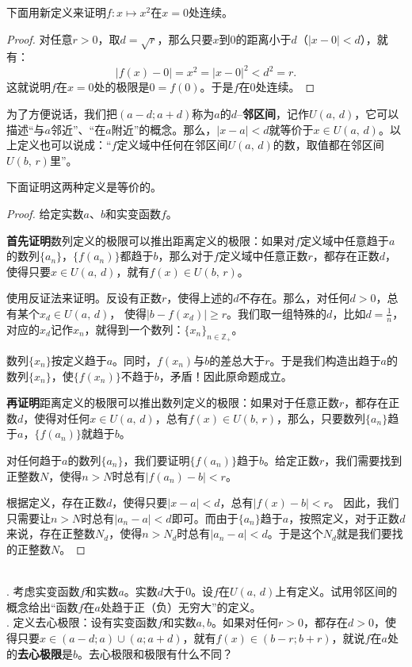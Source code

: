 \documentclass[12pt,UTF8]{ctexbook}
\begin{document}
下面用新定义来证明$f:x\mapsto x^2$在$x=0$处连续。
\begin{proof}
    对任意$r>0$，取$d = \sqrt{r}$，那么只要$x$到$0$的距离小于$d$（$|x - 0| < d$），就有：
    $$|f(x) - 0| = x^2  = |x - 0|^2 < d^2 = r.$$
    这就说明$f$在$x=0$处的极限是$0 = f(0)$。于是$f$在$0$处连续。
\end{proof}

为了方便说话，我们把$(a-d;a+d)$称为$a$的$d$–\textbf{邻区间}，记作$U(a,\,d)$，它可以描述“与$a$邻近”、“在$a$附近”的概念。那么，$|x - a| < d$就等价于$x\in U(a,\,d)$。以上定义也可以说成：“$f$定义域中任何在邻区间$U(a,\,d)$的数，取值都在邻区间$U(b,\,r)$里”。

下面证明这两种定义是等价的。
\begin{proof}
    给定实数$a$、$b$和实变函数$f$。

    \textbf{首先证明}数列定义的极限可以推出距离定义的极限：如果对$f$定义域中任意趋于$a$的数列$\{a_n\}$，$\{f(a_n)\}$都趋于$b$，那么对于$f$定义域中任意正数$r$，都存在正数$d$，使得只要$x\in U(a,\,d)$，就有$f(x)\in U(b,\,r)$。

    使用反证法来证明。反设有正数$r$，使得上述的$d$不存在。那么，对任何$d>0$，总有某个$x_d\in U(a,\,d)$，
    使得$ |b - f(x_d)| \geqslant r$。我们取一组特殊的$d$，比如$d = \frac{1}{n}$，对应的$x_d$记作$x_n$，就得到一个数列：$\{x_n\}_{n\in\mathbb{Z}_+}$。
    
    数列$\{x_n\}$按定义趋于$a$。同时，$f(x_n)$与$b$的差总大于$r$。于是我们构造出趋于$a$的数列$\{x_n\}$，使$\{f(x_n)\}$不趋于$b$，矛盾！因此原命题成立。

    \textbf{再证明}距离定义的极限可以推出数列定义的极限：如果对于任意正数$r$，都存在正数$d$，使得对任何$x\in U(a,\,d)$，总有$f(x)\in U(b,\,r)$，那么，只要数列$\{a_n\}$趋于$a$，$\{f(a_n)\}$就趋于$b$。

    对任何趋于$a$的数列$\{a_n\}$，我们要证明$\{f(a_n)\}$趋于$b$。给定正数$r$，我们需要找到正整数$N$，使得$n>N$时总有$|f(a_n) - b| < r$。
    
    根据定义，存在正数$d$，使得只要$|x - a| < d$，总有$|f(x) - b| < r$。
    因此，我们只需要让$n>N$时总有$|a_n - a| < d$即可。而由于$\{a_n\}$趋于$a$，按照定义，对于正数$d$来说，存在正整数$N_d$，使得$n>N_d$时总有$|a_n - a| < d$。于是这个$N_d$就是我们要找的正整数$N$。

\end{proof}

\begin{sk}
    \mbox{} \\
    . 考虑实变函数$f$和实数$a$。实数$d$大于$0$。设$f$在$U(a,\,d)$上有定义。试用邻区间的概念给出“函数$f$在$a$处趋于正（负）无穷大”的定义。\\
    . 定义去心极限：设有实变函数$f$和实数$a, b$。如果对任何$r>0$，都存在$d>0$，使得只要$x\in(a-d;a)\cup(a;a+d)$，就有$f(x)\in(b-r;b+r)$，就说$f$在$a$处的\textbf{去心极限}是$b$。去心极限和极限有什么不同？
\end{sk}
\end{document}
